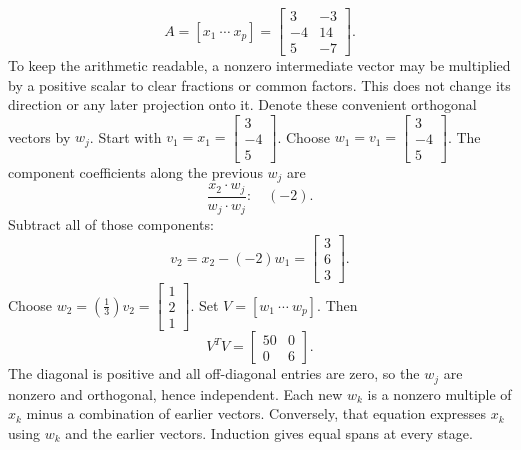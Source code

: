 \[A=[x_1\ \cdots\ x_p]=\left[\begin{array}{rr}3&-3\\-4&14\\5&-7\end{array}\right].\]
To keep the arithmetic readable, a nonzero intermediate vector may be multiplied by a positive scalar to clear fractions or common factors. This does not change its direction or any later projection onto it. Denote these convenient orthogonal vectors by $w_j$.
Start with $v_1=x_1=\left[\begin{array}{r}3\\-4\\5\end{array}\right]$.
Choose $w_{1}=v_{1}=\left[\begin{array}{r}3\\-4\\5\end{array}\right]$.
The component coefficients along the previous $w_j$ are
\[\frac{x_{2}\cdot w_j}{w_j\cdot w_j}:\quad(-2).\]
Subtract all of those components:
\[v_{2}=x_{2}-(-2)w_{1}=\left[\begin{array}{r}3\\6\\3\end{array}\right].\]
Choose $w_{2}=(\frac{1}{3})v_{2}=\left[\begin{array}{r}1\\2\\1\end{array}\right]$.
Set $V=[w_1\ \cdots\ w_p]$. Then
\[V^TV=\left[\begin{array}{rr}50&0\\0&6\end{array}\right].\]
The diagonal is positive and all off-diagonal entries are zero, so the $w_j$ are nonzero and orthogonal, hence independent. Each new $w_k$ is a nonzero multiple of $x_k$ minus a combination of earlier vectors. Conversely, that equation expresses $x_k$ using $w_k$ and the earlier vectors. Induction gives equal spans at every stage.


